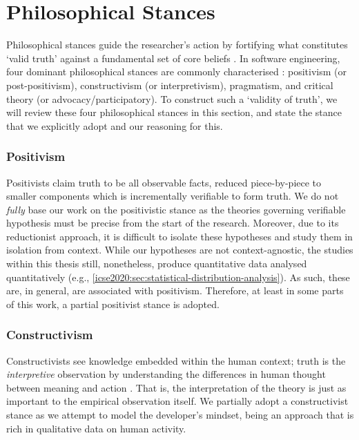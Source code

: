 \section{Philosophical Stances}
\label{sec:research-methodology:philosophical-stances}

Philosophical stances guide the researcher's action by fortifying what constitutes `valid truth' against a fundamental set of core beliefs \citep{Ritzer:1991ge}. In software engineering, four dominant philosophical stances are commonly characterised \citep{Creswell:2017vn,Petersen:2019ji}: positivism (or post-positivism), constructivism (or interpretivism), pragmatism, and critical theory (or advocacy/participatory). To construct such a `validity of truth', we will review these four philosophical stances in this section, and state the stance that we explicitly adopt and our reasoning for this.

\subsubsection*{Positivism}
Positivists claim truth to be all observable facts, reduced piece-by-piece to smaller components which is incrementally verifiable to form truth. We do not \textit{fully} base our work on the positivistic stance as the theories governing verifiable hypothesis must be precise from the start of the research. Moreover, due to its reductionist approach, it is difficult to isolate these hypotheses and study them in isolation from context.
While our hypotheses are not context-agnostic, the studies within this thesis still, nonetheless, produce quantitative data analysed quantitatively (e.g., \cref{icse2020:sec:statistical-distribution-analysis}). As such, these are, in general, are associated with positivism. Therefore, at least in some parts of this work, a partial positivist stance is adopted.

\subsubsection*{Constructivism}
Constructivists see knowledge embedded within the human context; truth is the \textit{interpretive} observation by understanding the differences in human thought between meaning and action \citep{Klein:1999uv}. That is, the interpretation of the theory is just as important to the empirical observation itself.
We partially adopt a constructivist stance as we attempt to model the developer's mindset, being an approach that is rich in qualitative data on human activity.

